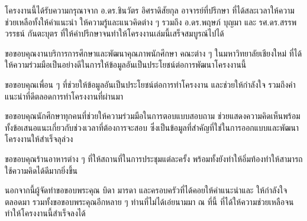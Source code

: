 \iffalse
\begin{dedication}
This document is dedicated to all Chiang Mai University students.

Dedication page is optional.
\end{dedication}
\fi %

\begin{acknowledgments}
โครงงานนี้ได้รับความกรุณาจาก อ.ดร.ชินวัตร อิศราดิสัยกุล อาจารย์ที่ปรึกษา ที่ได้สละเวลาให้ความช่วยเหลือทั้งให้คำแนะนำ ให้ความรู้และแนวคิดต่าง ๆ รวมถึง อ.ดร.พฤษภ์ บุญมา และ รศ.ดร.สรรพวรรธน์ กัน\-ตะบุตร ที่ให้คำปรึกษาจนทำให้โครงงานเล่มนี้เสร็จสมบูรณ์ไปได้
    
ขอขอบคุณงานบริการการศึกษาและพัฒนาคุณภาพนักศึกษา คณะต่าง ๆ ในมหาวิทยาลัยเชียงใหม่ ที่ได้ให้ความร่วมมือเป็นอย่างดีในการให้ข้อมูลอันเป็นประโยชน์ต่อการพัฒนาโครงงานนี้

ขอขอบคุณเพื่อน ๆ ที่ช่วยให้ข้อมูลอันเป็นประโยชน์ต่อการทำโครงงาน และช่วยให้กำลังใจ รวมถึงคำแนะนำที่ดีตลอดการทำโครงงานที่ผ่านมา

ขอขอบคุณนักศึกษาทุกคนที่ช่วยให้ความร่วมมือในการตอบแบบสอบถาม ช่วยแสดงความคิดเห็นพร้อมทั้งข้อเสนอแนะเกี่ยวกับช่วงเวลาที่ต้องการจะสอบ ซึ่งเป็นข้อมูลที่สำคัญที่ใช่ในการออกแบบและพัฒนาโครงงานให้สำเร็จลุล่วง

ขอขอบคุณร้านอาหารต่าง ๆ ที่ให้สถานที่ในการประชุมแต่ละครั้ง พร้อมทั้งยังทำให้อิ่มท้องทำให้สามารถใช้ความคิดได้ดีมากยิ่งขึ้น

นอกจากนี้ผู้จัดทำขอขอบพระคุณ บิดา มารดา และครอบครัวที่ได้คอยให้คำแนะนำและ ให้กำลังใจ ตลอดมา รวมทั้งขอขอบพระคุณอีกหลาย ๆ ท่านที่ไม่ได้เอ่ยนามมา ณ ที่นี้ ที่ได้ให้ความช่วยเหลือจนทำให้โครงงานนี้สำเร็จลงได้ 


\end{acknowledgments}%
\fi %

\contentspage

\ifproject
\figurelistpage

\tablelistpage
\fi %



